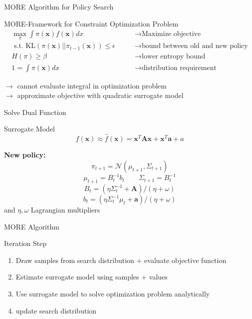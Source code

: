 \documentclass[navbarinfooter, 12pt]{sdqbeamer}
\begin{document}
\begin{frame}{MORE Algorithm for Policy Search}
\begin{block}{MORE-Framework for Constraint Optimization Problem}
  \begin{align*}
    \max_{\pi} \int \pi(\mathbf{x}) f(\mathbf{x}) dx \quad \quad  &\rightarrow \text{Maximize objective} \\
    \text{ s.t. KL}(\pi(\mathbf{x})||\pi_{t-1}(\mathbf{x})) \leq \epsilon \quad \quad &\rightarrow \text{bound between old and new policy} \\
    H(\pi) \geq \beta \quad \quad  &\rightarrow \text{lower entropy bound} \\ 
    1 = \int \pi(\mathbf{x}) dx  \quad \quad  &\rightarrow \text{distribution requirement}
  \end{align*}
\end{block}

$\rightarrow$ cannot evaluate integral in optimization problem \\
$\rightarrow$  approximate objective with quadratic surrogate model
\end{frame}


\begin{frame}{Solve Dual Function}
\begin{block}{Surrogate Model}
  $$f(\mathbf{x}) \approx \hat{f}(\mathbf{x}) = \mathbf{x}^T \mathbf{A} \mathbf{x} + \mathbf{x}^T \mathbf{a} + a $$
\end{block}
  \textbf{New policy:}
    $$ \pi_{t+1} = \mathcal{N}(\mu_{t+1}, \Sigma_{t+1}) $$
    $$ \mu_{t+1} = B_t^{-1} b_t   \quad \quad  \Sigma_{t+1} = B_t^{-1} $$
    $$ B_t = (\eta \Sigma_t^{-1} + \textbf{A}) / (\eta + \omega) $$
    $$ b_t = (\eta \Sigma_t^{-1} \mu_t + \textbf{a}) / (\eta + \omega) $$
    and $\eta, \omega$ Lagrangian multipliers
\end{frame}

\begin{frame}{MORE Algorithm}
  \begin{block}{Iteration Step}
    \begin{enumerate}
    \item Draw samples from search distribution + evaluate objective function
    \item Estimate surrogate model using samples + values
    \item Use surrogate model to solve optimization problem analytically
    \item update search distribution
    \end{enumerate}
  \end{block}
\end{frame}
\end{document}
